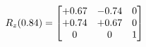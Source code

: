 \documentclass[preview]{standalone}
\begin{document}
\begin{align*}
\special{dvisvgm:raw <g id='unique000'>}R_{z}(0.84) = \begin{bmatrix}+0.67 & -0.74 & 0 \\+0.74 & +0.67 & 0 \\0 & 0 & 1\end{bmatrix}\special{dvisvgm:raw </g>}
\end{align*}
\end{document}
